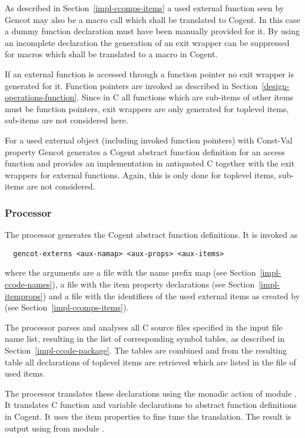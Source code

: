 As described in Section~\ref{impl-ccomps-items} a used external function seen by Gencot may also be a macro call 
which shall be translated to Cogent. In this case a dummy function declaration must have been manually provided 
for it. By using an incomplete declaration the generation of an exit wrapper can be suppressed for macros 
which shall be translated to a macro in Cogent.

If an external function is accessed through a function pointer no exit wrapper is generated for it.
Function pointers are invoked as described in Section~\ref{design-operations-function}. Since in C all functions
which are sub-items of other items must be function pointers, exit wrappers are only generated for toplevel
items, sub-items are not considered here.

For a used external object (including invoked function pointers) with Const-Val property Gencot generates a 
Cogent abstract function definition for an access function and provides an implementation in antiquoted C 
together with the exit wrappers for external functions. Again, this is only done for toplevel items, sub-items 
are not considered.

\subsubsection{Processor }

The processor  generates the Cogent abstract function definitions. It is invoked as
\begin{verbatim}
  gencot-externs <aux-namap> <aux-props> <aux-items>
\end{verbatim}
where the arguments are a file  with the name prefix map 
(see Section~\ref{impl-ccode-names}), a file  with the item property declarations (see 
Section~\ref{impl-itemprops}) and a file  with the identifiers of the used external items as created 
by  (see Section~\ref{impl-ccomps-items}).

The processor parses and analyses
all C source files specified in the input file name list, resulting in the list of corresponding symbol tables, as
described in Section~\ref{impl-ccode-package}. The tables are combined and from the resulting table all 
declarations of toplevel items are retrieved which are listed in the file of used items.

The processor translates these declarations using the monadic action  of
module . It translates C function and variable declarations to abstract function 
definitions in Cogent. It uses the item properties to fine tune the translation.
The result is output using  from module .

